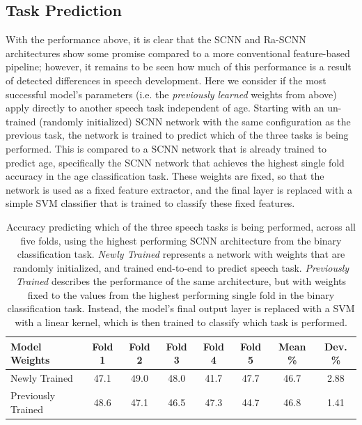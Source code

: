 \documentclass[fleqn,10pt]{wlscirep}
\begin{document}
\subsection*{Task Prediction}

With the performance above, it is clear that the SCNN and Ra-SCNN architectures show some promise compared to a more conventional feature-based pipeline; however, it remains to be seen how much of this performance is a result of detected differences in speech development. Here we consider if the most successful model's parameters (i.e. the {\em previously learned} weights from above) apply directly to another speech task independent of age. Starting with an un-trained (randomly initialized) SCNN network with the same configuration as the previous task, the network is trained to predict which of the three tasks is being performed. This is compared to a SCNN network that is already trained to predict age, specifically the SCNN network that achieves the highest single fold accuracy in the age classification task. These weights are fixed, so that the network is used as a fixed feature extractor, and the final layer is replaced with a simple SVM classifier that is trained to classify these fixed features.

\begin{table}[h]
 \caption{Accuracy predicting which of the three speech tasks is being performed, across all five folds, using the highest performing SCNN architecture from the binary classification task. \textit{Newly Trained} represents a network with weights that are randomly initialized, and trained end-to-end to predict speech task. \textit{Previously Trained} describes the performance of the same architecture, but with weights fixed to the values from the highest performing single fold in the binary classification task. Instead, the model's final output layer is replaced with a SVM with a linear kernel, which is then trained to classify which task is performed.}
 \centering
 \begin{tabular}{l | c | c | c | c | c | c | c}
   \toprule
   \textbf{Model Weights} & \textbf{Fold 1} & \textbf{Fold 2} & \textbf{Fold 3} & \textbf{Fold 4} & \textbf{Fold 5} & \textbf{Mean \%} & \textbf{Dev. \%}\\
   \toprule
                        Newly Trained           & 47.1 & 49.0 & 48.0 & 41.7 & 47.7 & 46.7 & 2.88 \\
   \midrule
                        Previously Trained      & 48.6 & 47.1 & 46.5 & 47.3 & 44.7 & 46.8 & 1.41 \\ 
   \bottomrule
 \end{tabular}
 \label{tab:task_results}
\end{table}
\end{document}
